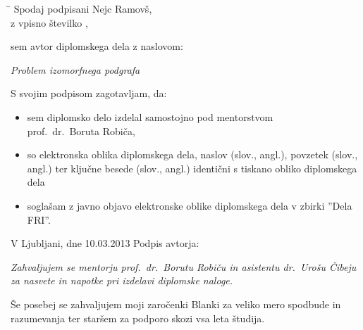 \documentclass[a4paper, 12pt, ]{book}
\newcommand{\clearemptydoublepage}{\newpage{\pagestyle{empty}\cleardoublepage}}
\begin{document}
	\vspace{1cm}
	
	\begin{tabbing}
	\hspace*{4cm}\= \kill
	Spodaj podpisani \> Nejc Ramovš,  \\[0.3cm]
	z vpisno številko , \\
	\end{tabbing}
	
	\noindent sem avtor  diplomskega dela z naslovom:
	 
	
	\vspace{0.5cm}
	\emph{Problem izomorfnega podgrafa}
	
	\vspace{1.5cm}
	\noindent S svojim podpisom zagotavljam, da:
	\begin{itemize}
		\item sem diplomsko delo izdelal samostojno pod mentorstvom\\ prof.~dr.~Boruta Robiča,
	
		\item	so elektronska oblika diplomskega dela, naslov (slov., angl.), povzetek (slov., angl.) ter 
		ključne besede (slov., angl.) identični s tiskano obliko diplomskega dela

		\item soglašam z javno objavo elektronske oblike diplomskega dela v zbirki ''Dela FRI''.
	\end{itemize}
	
	\vspace{1cm}
	\noindent V Ljubljani, dne 10.03.2013 \hspace{3cm} Podpis avtorja:
	
	\clearemptydoublepage
	
	
	
	
	\thispagestyle{empty}\mbox{}\vfill\null\it%
	Zahvaljujem se mentorju prof.~dr.~Borutu Robiču in asistentu dr.~Urošu Čibeju za nasvete in napotke pri izdelavi diplomske naloge.
	
	\vspace{1cm}
	
	Še posebej se zahvaljujem moji zaročenki Blanki za veliko mero spodbude in razumevanja ter staršem za podporo skozi vsa leta študija.
	\rm\normalfont
	
	\clearemptydoublepage
	
	
	\def\thepage{}%
	\tableofcontents{}
	
\end{document}
